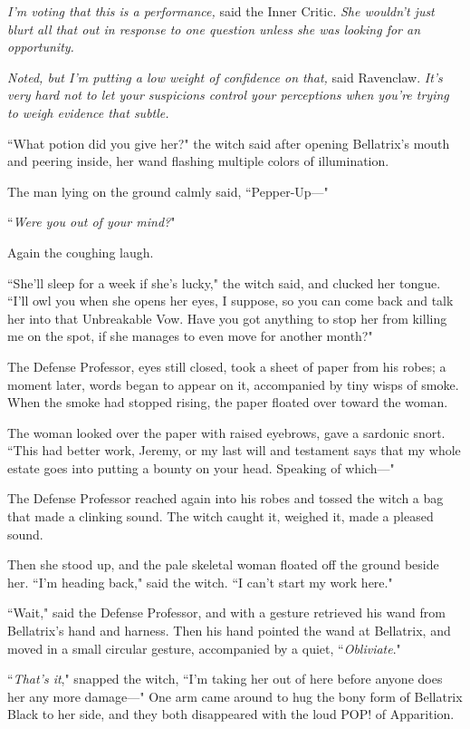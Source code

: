 \emph{I'm voting that this is a performance,} said the Inner Critic. \emph{She wouldn't just blurt all that out in response to one question unless she was looking for an opportunity.}

\emph{Noted, but I'm putting a low weight of confidence on that,} said Ravenclaw. \emph{It's very hard not to let your suspicions control your perceptions when you're trying to weigh evidence that subtle.}

``What potion did you give her?" the witch said after opening Bellatrix's mouth and peering inside, her wand flashing multiple colors of illumination.

The man lying on the ground calmly said, ``Pepper-Up---"

``\emph{Were you out of your mind?}"

Again the coughing laugh.

``She'll sleep for a week if she's lucky," the witch said, and clucked her tongue. ``I'll owl you when she opens her eyes, I suppose, so you can come back and talk her into that Unbreakable Vow. Have you got anything to stop her from killing me on the spot, if she manages to even move for another month?"

The Defense Professor, eyes still closed, took a sheet of paper from his robes; a moment later, words began to appear on it, accompanied by tiny wisps of smoke. When the smoke had stopped rising, the paper floated over toward the woman.

The woman looked over the paper with raised eyebrows, gave a sardonic snort. ``This had better work, Jeremy, or my last will and testament says that my whole estate goes into putting a bounty on your head. Speaking of which---"

The Defense Professor reached again into his robes and tossed the witch a bag that made a clinking sound. The witch caught it, weighed it, made a pleased sound.

Then she stood up, and the pale skeletal woman floated off the ground beside her. ``I'm heading back," said the witch. ``I can't start my work here."

``Wait," said the Defense Professor, and with a gesture retrieved his wand from Bellatrix's hand and harness. Then his hand pointed the wand at Bellatrix, and moved in a small circular gesture, accompanied by a quiet, ``\emph{Obliviate}."

``\emph{That's it}," snapped the witch, ``I'm taking her out of here before anyone does her any more damage---" One arm came around to hug the bony form of Bellatrix Black to her side, and they both disappeared with the loud POP! of Apparition.

